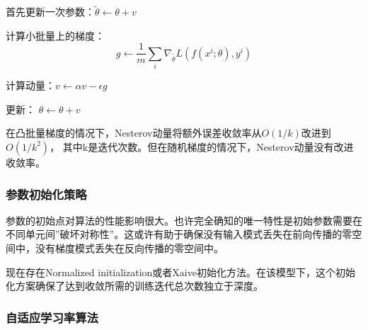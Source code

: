 \begin{itemize}
\begin{algorithm}
\begin{algorithmic}
	首先更新一次参数：$\tilde{\theta} \leftarrow \theta + v$
	
	
	计算小批量上的梯度：
	\begin{displaymath}
		g \leftarrow \frac{1}{m} \sum_{i}\nabla_{\tilde{\theta}}L(f(x^{i}; \theta), y^{i})
	\end{displaymath}
		
	计算动量：$v \leftarrow \alpha v - \epsilon g$
	
	更新： $\theta \leftarrow \theta + v$	
	
\end{algorithmic}
\end{algorithm}

在凸批量梯度的情况下，Nesterov动量将额外误差收敛率从$O(1/k)$改进到$O(1/k^2)$， 其中k是迭代次数。但在随机梯度的情况下，Nesterov动量没有改进收敛率。

\end{itemize}

\subsubsection{参数初始化策略}

参数的初始点对算法的性能影响很大。也许完全确知的唯一特性是初始参数需要在不同单元间''破坏对称性''。这或许有助于确保没有输入模式丢失在前向传播的零空间中，没有梯度模式丢失在反向传播的零空间中。

现在存在Normalized initialization或者Xaive初始化方法。在该模型下，这个初始化方案确保了达到收敛所需的训练迭代总次数独立于深度。

\subsubsection{自适应学习率算法}

